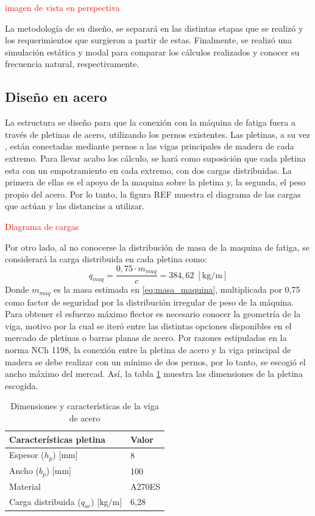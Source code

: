 \textcolor{red}{imagen de vista en perspectiva}

La metodología de su diseño, se separará en las distintas etapas que se realizó y los requerimientos que surgieron a partir de estas. Finalmente, se realizó una simulación estática y modal para comparar los cálculos realizados y conocer su frecuencia natural, respectivamente.
\subsection{Diseño en acero}
La estructura se diseño para que la conexión con la máquina de fatiga fuera a través de pletinas de acero, utilizando los pernos existentes. Las pletinas, a su vez , están conectadas mediante pernos a las vigas principales de madera de cada extremo. Para llevar acabo los cálculo, se hará como suposición que cada pletina esta con un empotramiento en cada extremo, con dos cargas distribuidas. La primera de ellas es el apoyo de la maquina sobre la pletina y, la segunda, el peso propio del acero. Por lo tanto, la figura REF muestra el diagrama de las cargas que actúan y las distancias a utilizar. 

\textcolor{red}{Diagrama de cargas}

Por otro lado, al no conocerse la distribución de masa de la maquina de fatiga, se considerará la carga distribuida en cada pletina como:
\begin{equation}
	 q_{maq} = \frac{0,75\cdot m_{maq}}{c} = 384,62 \; [\text{kg/m}]
\end{equation}
Donde $m_{maq}$ es la masa estimada en \ref{eq:masa_maquina}, multiplicada por 0,75 como factor de seguridad por la distribución irregular de peso de la máquina. Para obtener el esfuerzo máximo flector es necesario conocer la geometría de la viga, motivo por la cual se iteró entre las distintas opciones disponibles en el mercado de pletinas o barras planas de acero. Por razones estipuladas en la norma NCh 1198, la conexión entre la pletina de acero y la viga principal de madera se debe realizar con un mínimo de dos pernos, por lo tanto, se escogió el ancho máximo del mercad. Así, la tabla \ref{tab:dimycar_pletina} muestra las dimensiones de la pletina escogida.
\begin{table}[h]
\centering
\begin{tabular}{@{}ll@{}}
\toprule
Características pletina			       			& Valor        \\ \midrule
Espesor ($h_p$) {[}mm{]}              			& 8            \\
Ancho ($b_p$) {[}mm{]}               		    & 100          \\
Material    		                		    & A270ES	   \\
Carga distribuida ($q_{ac}$) {[}kg/m{]}		    & 6,28         \\ \bottomrule
\end{tabular}
\caption{Dimensiones y características de la viga de acero}
\label{tab:dimycar_pletina}
\end{table}

